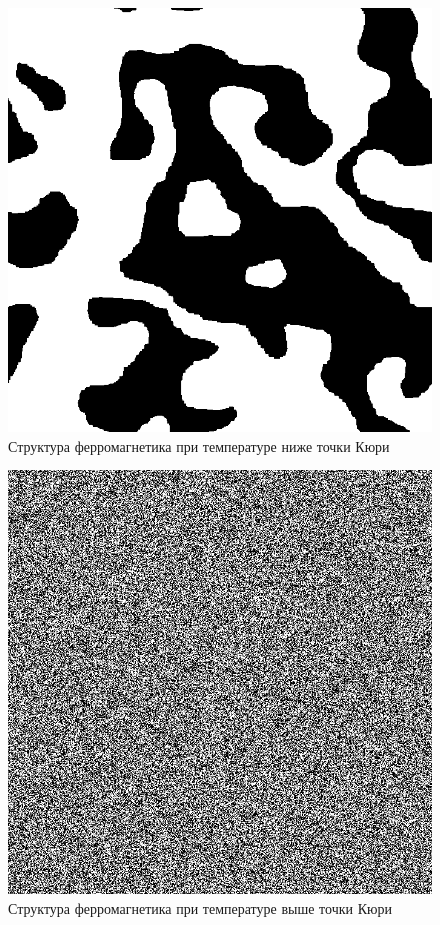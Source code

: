 \documentclass[12pt]{report}
\theoremstyle{definition}
\begin{document}
\begin{figure}[hbtp]
    \centering
    \includegraphics[scale=0.2]{img/low_t.png}
    \caption{Структура ферромагнетика при температуре ниже точки Кюри}
\end{figure}
\begin{figure}[hbtp]
    \centering
    \includegraphics[scale=0.2]{img/high_t.png}
    \caption{Структура ферромагнетика при температуре выше точки Кюри}
\end{figure}
\end{document}
